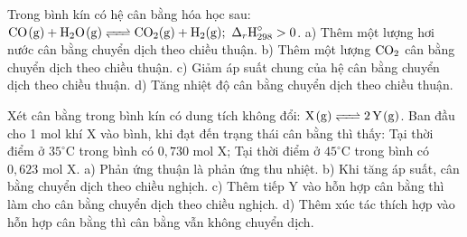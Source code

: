 \documentclass[12pt,a4paper]{article}
\begin{document}
\begin{ex}
Trong bình kín có hệ cân bằng hóa học sau: $\ce{CO(g) + H2O(g) <=> CO2(g) + H2(g)};\ \Delta_r\text{H}^\circ_{298} > 0$.
\choiceTF
{\True a) Thêm một lượng hơi nước cân bằng chuyển dịch theo chiều thuận.}
{b) Thêm một lượng $\ce{CO2}$ cân bằng chuyển dịch theo chiều thuận.}
{c) Giảm áp suất chung của hệ cân bằng chuyển dịch theo chiều thuận.}
{\True d) Tăng nhiệt độ cân bằng chuyển dịch theo chiều thuận.}
\end{ex}

\begin{ex}
Xét cân bằng trong bình kín có dung tích không đổi: $\ce{X(g) <=> 2Y(g)}$. Ban đầu cho 1 mol khí X vào bình, khi đạt đến trạng thái cân bằng thì thấy: Tại thời điểm ở $35^\circ\text{C}$ trong bình có $0{,}730\text{ mol X}$; Tại thời điểm ở $45^\circ\text{C}$ trong bình có $0{,}623\text{ mol X}$.
\choiceTF
{\True a) Phản ứng thuận là phản ứng thu nhiệt.}
{\True b) Khi tăng áp suất, cân bằng chuyển dịch theo chiều nghịch.}
{\True c) Thêm tiếp Y vào hỗn hợp cân bằng thì làm cho cân bằng chuyển dịch theo chiều nghịch.}
{\True d) Thêm xúc tác thích hợp vào hỗn hợp cân bằng thì cân bằng vẫn không chuyển dịch.}
\end{ex}
\end{document}

